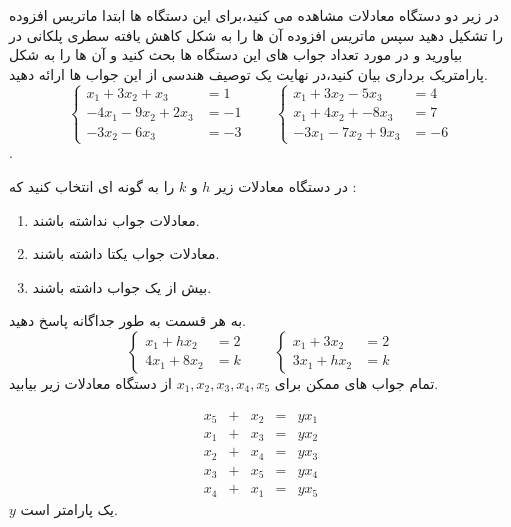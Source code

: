 \documentclass{article}
\begin{document}


در زیر دو دستگاه معادلات مشاهده می کنید،برای این دستگاه ها ابتدا ماتریس افزوده را تشکیل دهید سپس ماتریس افزوده آن ها را به شکل کاهش یافته سطری پلکانی در بیاورید و در مورد تعداد جواب های این دستگاه ها بحث کنید و آن ها را به شکل پارامتریک برداری بیان کنید،در نهایت یک توصیف هندسی از این جواب ها ارائه دهید.
\begin{equation*}
\left\{
\begin{array}{rl}
 x_1+3x_2+x_3&=1\\
-4x_1-9x_2+2x_3&=-1\\
-3x_2-6x_3&=-3
\end{array} \right.\qquad
\left\{
\begin{array}{rl}
 x_1+3x_2-5x_3&=4\\
x_1+4x_2+-8x_3&=7\\
-3x_1-7x_2+9x_3&=-6
\end{array} \right.
\end{equation*}
.



در دستگاه معادلات زیر 
$h$
و 
$k$
را به گونه ای انتخاب کنید که :
\begin{enumerate}
\item
معادلات جواب نداشته باشند.
\item 
معادلات جواب یکتا داشته باشند.
\item 
بیش از یک جواب داشته باشند.

\end{enumerate}
به هر قسمت به طور جداگانه پاسخ دهید.
\begin{equation*}
\left\{
\begin{array}{rl}
x_1+hx_2&=2\\
4x_1+8x_2&=k
\end{array} \right.\qquad
\left\{
\begin{array}{rl}
x_1+3x_2&=2\\
3x_1+hx_2&=k
\end{array} \right.
\end{equation*}
تمام جواب های ممکن برای 
$x_1,x_2,x_3,x_4,x_5$
از دستگاه معادلات زیر بیابید.

$$\begin{array}{ccccc}
x_5&+&x_2&=&yx_1\\
x_1&+&x_3&=&yx_2\\
x_2&+&x_4&=&yx_3\\
x_3&+&x_5&=&yx_4\\
x_4&+&x_1&=&yx_5
\end{array}$$
$y$
یک پارامتر است.
\end{document}
